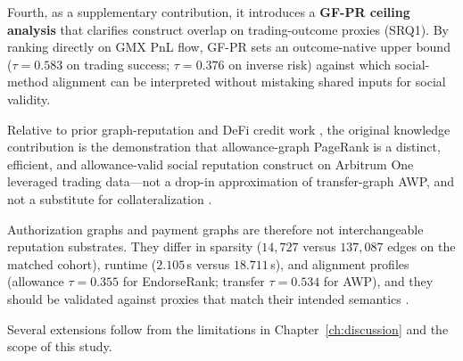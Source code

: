 Fourth, as a supplementary contribution, it introduces a \textbf{GF-PR ceiling analysis} that clarifies construct overlap on trading-outcome proxies (SRQ1). By ranking directly on GMX PnL flow, GF-PR sets an outcome-native upper bound ($\tau=0.583$ on trading success; $\tau=0.376$ on inverse risk) against which social-method alignment can be interpreted without mistaking shared inputs for social validity.

Relative to prior graph-reputation and DeFi credit work , the original knowledge contribution is the demonstration that allowance-graph PageRank is a distinct, efficient, and allowance-valid social reputation construct on Arbitrum One leveraged trading data---not a drop-in approximation of transfer-graph AWP, and not a substitute for collateralization .

Authorization graphs and payment graphs are therefore not interchangeable reputation substrates. They differ in sparsity ($14{,}727$ versus $137{,}087$ edges on the matched cohort), runtime ($2.105$\,s versus $18.711$\,s), and alignment profiles (allowance $\tau=0.355$ for EndorseRank; transfer $\tau=0.534$ for AWP), and they should be validated against proxies that match their intended semantics .


Several extensions follow from the limitations in Chapter~\ref{ch:discussion} and the scope of this study.


